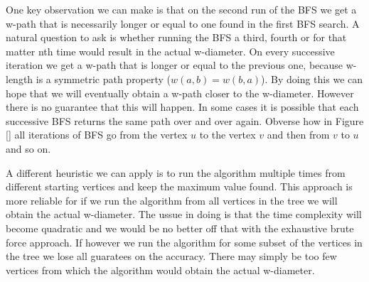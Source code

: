 One key observation we can make is that on the second run of the BFS we get a w-path that is necessarily longer or equal to one found in the first BFS search. A natural question to ask is whether running the BFS a third, fourth or for that matter nth time would result in the actual w-diameter. On every successive iteration we get a w-path that is longer or equal to the previous one, because w-length is a symmetric path property ($w(a, b) = w(b, a)$). By doing this we can hope that we will eventually obtain a w-path closer to the w-diameter. However there is no guarantee that this will happen. In some cases it is possible that each successive BFS returns the same path over and over again. Obverse how in Figure [] all iterations of BFS go from the vertex $u$ to the vertex $v$ and then from $v$ to $u$ and so on.

A different heuristic we can apply is to run the algorithm multiple times from different starting vertices and keep the maximum value found. This approach is more reliable for if we run the algorithm from all vertices in the tree we will obtain the actual w-diameter. The ussue in doing is that the time complexity will become quadratic and we would be no better off that with the exhaustive brute force approach. If however we run the algorithm for some subset of the vertices in the tree we lose all guaratees on the accuracy. There may simply be too few vertices from which the algorithm would obtain the actual w-diameter.




